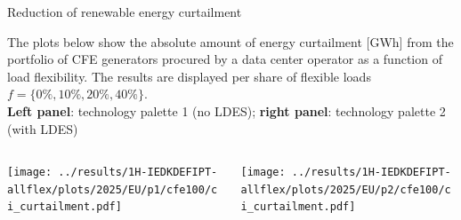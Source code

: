 
\begin{frame}{Reduction of renewable energy curtailment}
  \label{curtailment}
  
    {\footnotesize
  The plots below show the absolute amount of energy curtailment [GWh] from the portfolio of CFE generators procured by a data center operator as a function of load flexibility. The results are displayed per share of flexible loads $f = \{0\%, 10\%, 20\%, 40\%\}$.
  \\
  {\bf Left panel}: technology palette 1 (no LDES); {\bf right panel}: technology palette 2 (with LDES)
    
    \vspace{0.3cm} 
    \begin{columns}
      \begin{column}{7cm}
      \texttt{[image: ../results/1H-IEDKDEFIPT-allflex/plots/2025/EU/p1/cfe100/ci\_curtailment.pdf]}
      \end{column}
      
      \begin{column}{7cm}
      \texttt{[image: ../results/1H-IEDKDEFIPT-allflex/plots/2025/EU/p2/cfe100/ci\_curtailment.pdf]}
      \end{column}
    \end{columns}
  
    }
    
  \end{frame}


